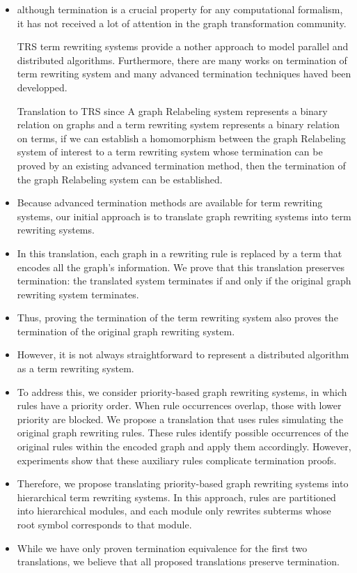 \begin{itemize}
    \item although termination is a crucial property for any computational formalism, it has not received a lot of attention in the graph transformation community.
    \item[TRS] term rewriting systems provide a nother approach to model parallel and distributed algorithms. Furthermore, there are many works on termination of term rewriting system and many advanced termination techniques haved been developped.
    \item[Translation to TRS] since A graph Relabeling system represents a binary relation on graphs and a term rewriting system represents a binary relation on terms, if we can establish a homomorphism between the  graph Relabeling system of interest to a term rewriting system whose termination can be proved by an existing advanced termination method, then the termination of the  graph Relabeling system can be established.
    
    \item  Because advanced termination methods are available for term rewriting systems, our initial approach is to translate graph rewriting systems into term rewriting systems. 
    \item In this translation, each graph in a rewriting rule is replaced by a term that encodes all the graph's information. We prove that this translation preserves termination: the translated system terminates if and only if the original graph rewriting system terminates. 
    \item Thus, proving the termination of the term rewriting system also proves the termination of the original graph rewriting system. 
    \item However, it is not always straightforward to represent a distributed algorithm as a term rewriting system.

    \item To address this, we consider priority-based graph rewriting systems, in which rules have a priority order. When rule occurrences overlap, those with lower priority are blocked. We propose a translation that uses rules simulating the original graph rewriting rules. These rules identify possible occurrences of the original rules within the encoded graph and apply them accordingly. However, experiments show that these auxiliary rules complicate termination proofs.

    \item Therefore, we propose translating priority-based graph rewriting systems into hierarchical term rewriting systems. In this approach, rules are partitioned into hierarchical modules, and each module only rewrites subterms whose root symbol corresponds to that module. 
    \item While we have only proven termination equivalence for the first two translations, we believe that all proposed translations preserve termination.  
\end{itemize}

